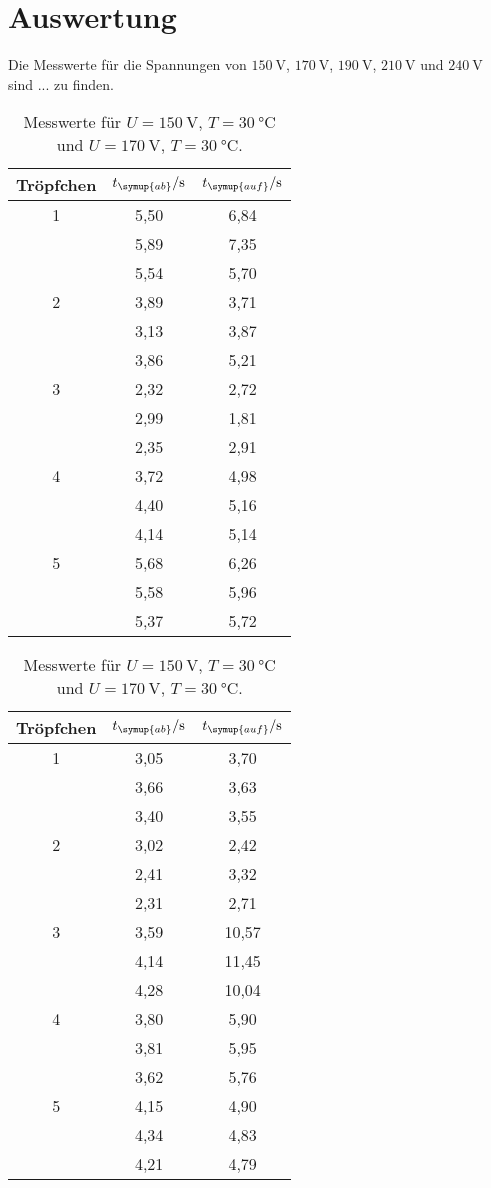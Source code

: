 \section{Auswertung}
\label{sec:Auswertung}  

Die Messwerte für die Spannungen von $\SI{150}{\volt}$, $\SI{170}{\volt}$, $\SI{190}{\volt}$, $\SI{210}{\volt}$
und $\SI{240}{\volt}$ sind ... zu finden.

\begin{table}
  \centering
  \caption{Messwerte für $U=\SI{150}{\volt}$, $T=\SI{30}{\celsius}$ und
  $U=\SI{170}{\volt}$, $T=\SI{30}{\celsius}$.}
  \label{tab:t12}
  \begin{tabular}{c c c}
    \toprule
    Tröpfchen & $t_{\symup{ab}}/\unit{\second}$ & $t_{\symup{auf}}/\unit{\second}$ \\
    \midrule
    1 & 5,50 & 6,84 \\
      & 5,89 & 7,35 \\
      & 5,54 & 5,70 \\
    2 & 3,89 & 3,71 \\
      & 3,13 & 3,87 \\
      & 3,86 & 5,21 \\
    3 & 2,32 & 2,72 \\
      & 2,99 & 1,81 \\
      & 2,35 & 2,91 \\
    4 & 3,72 & 4,98 \\
      & 4,40 & 5,16 \\
      & 4,14 & 5,14 \\
    5 & 5,68 & 6,26 \\
      & 5,58 & 5,96 \\
      & 5,37 & 5,72 \\
    \bottomrule
  \end{tabular}
  \quad
  \begin{tabular}{c c c}
    \toprule
    Tröpfchen & $t_{\symup{ab}}/\unit{\second}$ & $t_{\symup{auf}}/\unit{\second}$ \\
    \midrule
    1 & 3,05 &  3,70 \\
      & 3,66 &  3,63 \\
      & 3,40 &  3,55 \\
    2 & 3,02 &  2,42 \\
      & 2,41 &  3,32 \\
      & 2,31 &  2,71 \\
    3 & 3,59 & 10,57 \\
      & 4,14 & 11,45 \\
      & 4,28 & 10,04 \\
    4 & 3,80 &  5,90 \\
      & 3,81 &  5,95 \\
      & 3,62 &  5,76 \\
    5 & 4,15 &  4,90 \\
      & 4,34 &  4,83 \\
      & 4,21 &  4,79 \\
    \bottomrule
  \end{tabular}
\end{table}

